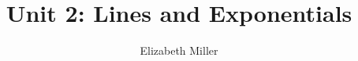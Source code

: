 \documentclass{ximera}
\author{Elizabeth Miller}
\title{Unit 2: Lines and Exponentials}
\begin{document}
\begin{abstract}
\end{abstract}
\maketitle

\begin{overview}
\item
%
%
%	
%
%
%

\end{overview}
\end{document}
